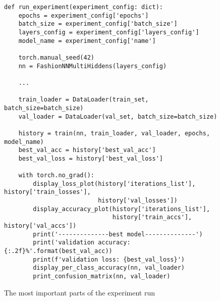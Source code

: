 \newpage
\begin{figure}[H]
    \centering
    \begin{verbatim}
def run_experiment(experiment_config: dict):
    epochs = experiment_config['epochs']
    batch_size = experiment_config['batch_size']
    layers_config = experiment_config['layers_config']
    model_name = experiment_config['name']

    torch.manual_seed(42)
    nn = FashionNNMultiHiddens(layers_config)

    ...

    train_loader = DataLoader(train_set, batch_size=batch_size)
    val_loader = DataLoader(val_set, batch_size=batch_size)

    history = train(nn, train_loader, val_loader, epochs, model_name)
    best_val_acc = history['best_val_acc']
    best_val_loss = history['best_val_loss']

    with torch.no_grad():
        display_loss_plot(history['iterations_list'], history['train_losses'],
                          history['val_losses'])
        display_accuracy_plot(history['iterations_list'],
                              history['train_accs'], history['val_accs'])
        print('--------------best model--------------')
        print('validation accuracy: {:.2f}%'.format(best_val_acc))
        print(f'validation loss: {best_val_loss}')
        display_per_class_accuracy(nn, val_loader)
        print_confusion_matrix(nn, val_loader)
    \end{verbatim}
    \caption{The most important parts of the experiment run}
    \label{fig:experiments:clssification:implementation:run}
\end{figure}
